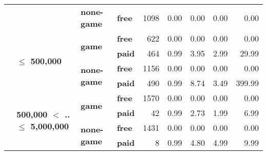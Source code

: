\begin{tabular}{llll|rrrrr}
\cline{3-9}
      &                                 & \textbf{none-game} & \textbf{free} &   1098 &       0.00 &       0.00 &       0.00 &          0.00 \\
\cline{2-9}
      & \multirow{4}{*}{\textbf{$\leq$ 500,000}} & \multirow{2}{*}{\textbf{game}} & \textbf{free} &    622 &       0.00 &       0.00 &       0.00 &          0.00 \\
      &                                 &           & \textbf{paid} &    464 &       0.99 &       3.95 &       2.99 &         29.99 \\
\cline{3-9}
      &                                 & \multirow{2}{*}{\textbf{none-game}} & \textbf{free} &   1156 &       0.00 &       0.00 &       0.00 &          0.00 \\
      &                                 &           & \textbf{paid} &    490 &       0.99 &       8.74 &       3.49 &        399.99 \\
\cline{2-9}
\cline{3-9}
      & \multirow{4}{*}{\textbf{500,000 $<$ .. $\leq$ 5,000,000}} & \multirow{2}{*}{\textbf{game}} & \textbf{free} &   1570 &       0.00 &       0.00 &       0.00 &          0.00 \\
      &                                 &           & \textbf{paid} &     42 &       0.99 &       2.73 &       1.99 &          6.99 \\
\cline{3-9}
      &                                 & \multirow{2}{*}{\textbf{none-game}} & \textbf{free} &   1431 &       0.00 &       0.00 &       0.00 &          0.00 \\
      &                                 &           & \textbf{paid} &      8 &       0.99 &       4.80 &       4.99 &          9.99 \\
\bottomrule
\end{tabular}
